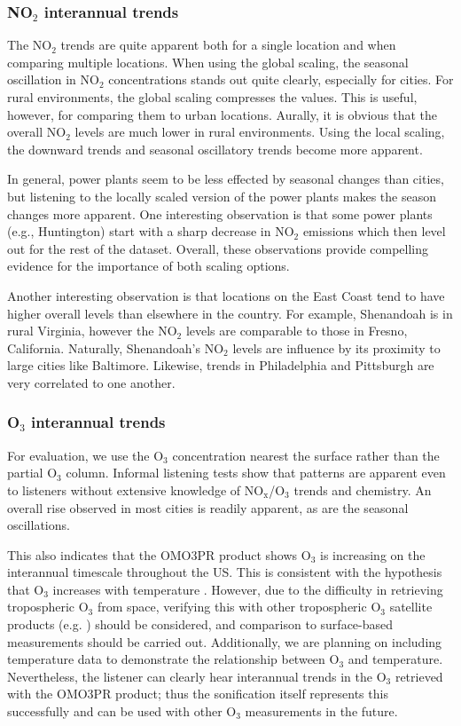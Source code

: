 \documentclass[a4paper,10pt,oneside]{article}
\newcommand{\ce}[1]{$\mathrm{#1}$}
\begin{document}
\begin{sloppy}
\subsubsection{NO$_2$ interannual trends}
The \ce{NO_2} trends are quite apparent both for a single location and when comparing multiple locations.  When using the global scaling, the seasonal oscillation in \ce{NO_2} concentrations stands out quite clearly, especially for cities. For rural environments, the global scaling compresses the values.  This is useful, however, for comparing them to urban locations.  Aurally, it is obvious that the overall \ce{NO_2} levels are much lower in rural environments. Using the local scaling, the downward trends and seasonal oscillatory trends become more apparent. 

In general, power plants seem to be less effected by seasonal changes than cities, but listening to the locally scaled version of the power plants makes the season changes more apparent. One interesting observation is that some power plants (e.g., Huntington) start with a sharp decrease in \ce{NO_2} emissions which then level out for the rest of the dataset. Overall, these observations provide compelling evidence for the importance of both scaling options.  

Another interesting observation is that locations on the East Coast tend to have higher overall levels than elsewhere in the country.  For example, Shenandoah is in rural Virginia, however the \ce{NO_2} levels are comparable to those in Fresno, California.  Naturally, Shenandoah's  \ce{NO_2} levels are influence by its proximity to large cities like Baltimore. Likewise, trends in Philadelphia and Pittsburgh are very correlated to one another. 

\subsubsection{O$_3$ interannual trends}
For evaluation, we use the \ce{O_3} concentration nearest the surface rather than the partial \ce{O_3} column.  Informal listening tests show that patterns are apparent even to listeners without extensive knowledge of \ce{NO_x}/\ce{O_3} trends and chemistry.  An overall rise observed in most cities is readily apparent, as are the seasonal oscillations. 

This also indicates that the OMO3PR product shows \ce{O_3} is increasing on the interannual timescale throughout the US. This is consistent with the hypothesis that \ce{O_3} increases with temperature \cite{lin17}. However, due to the difficulty in retrieving tropospheric \ce{O_3} from space, verifying this with other tropospheric \ce{O_3} satellite products (e.g. \cite{choi08}) should be considered, and comparison to surface-based measurements should be carried out. Additionally, we are planning on including temperature data to demonstrate the relationship between \ce{O_3} and temperature.  Nevertheless, the listener can clearly hear interannual trends in the \ce{O_3} retrieved with the OMO3PR product; thus the sonification itself represents this successfully and can be used with other \ce{O_3} measurements in the future.


\end{sloppy}
\end{document}
